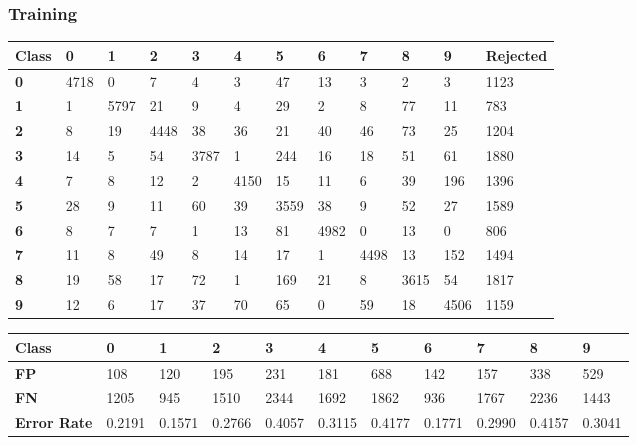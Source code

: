 \documentclass[
  a4paper,            %
  DIV=10,             %
  oneside,            %
  BCOR=5mm,           %
  parskip=half,       %
  numbers=noenddot,   %
  bibtotoc,           %
  listof=totoc,        %
  article
]{scrreprt}
\begin{document}
\subsubsection{Training}
\begin{center}
  \begin{tabular}{|p{1cm}|p{1cm}|p{1cm}|p{1cm}|p{1cm}|p{1cm}|p{1cm}|p{1cm}|p{1cm}|p{1cm}|p{1cm}|p{1.7cm}|}
    \hline
    \textbf{Class} & \textbf{0} & \textbf{1} & \textbf{2} & \textbf{3} & \textbf{4} & \textbf{5} & \textbf{6} & \textbf{7} & \textbf{8} & \textbf{9} & \textbf{Rejected} \\
    \hline
    \textbf{0} & 4718 & 0 & 7 & 4 & 3 & 47 & 13 & 3 & 2 & 3 & 1123 \\
    \hline
    \textbf{1} & 1 & 5797 & 21 & 9 & 4 & 29 & 2 & 8 & 77 & 11 & 783 \\
    \hline
    \textbf{2} & 8 & 19 & 4448 & 38 & 36 & 21 & 40 & 46 & 73 & 25 & 1204 \\
    \hline
    \textbf{3} & 14 & 5 & 54 & 3787 & 1 & 244 & 16 & 18 & 51 & 61 & 1880 \\
    \hline
    \textbf{4} & 7 & 8 & 12 & 2 & 4150 & 15 & 11 & 6 & 39 & 196 & 1396 \\
    \hline
    \textbf{5} & 28 & 9 & 11 & 60 & 39 & 3559 & 38 & 9 & 52 & 27 & 1589 \\
    \hline
    \textbf{6} & 8 & 7 & 7 & 1 & 13 & 81 & 4982 & 0 & 13 & 0 & 806 \\
    \hline
    \textbf{7} & 11 & 8 & 49 & 8 & 14 & 17 & 1 & 4498 & 13 & 152 & 1494 \\
    \hline
    \textbf{8} & 19 & 58 & 17 & 72 & 1 & 169 & 21 & 8 & 3615 & 54 & 1817 \\
    \hline
    \textbf{9} & 12 & 6 & 17 & 37 & 70 & 65 & 0 & 59 & 18 & 4506 & 1159 \\
    \hline
  \end{tabular}
\end{center}

\begin{center}
  \begin{tabular}{|p{1cm}|p{1cm}|p{1cm}|p{1cm}|p{1cm}|p{1cm}|p{1cm}|p{1cm}|p{1cm}|p{1cm}|p{1cm}|}
    \hline
    \textbf{Class} & \textbf{0} & \textbf{1} & \textbf{2} & \textbf{3} & \textbf{4} & \textbf{5} & \textbf{6} & \textbf{7} & \textbf{8} & \textbf{9} \\
    \hline
    \textbf{FP} & 108 & 120 & 195 & 231 & 181 & 688 & 142 & 157 & 338 & 529 \\
    \hline
    \textbf{FN} & 1205 & 945 & 1510 & 2344 & 1692 & 1862 & 936 & 1767 & 2236 & 1443 \\
    \hline
    \textbf{Error Rate} & 0.2191 & 0.1571 & 0.2766 & 0.4057 & 0.3115 & 0.4177 & 0.1771 & 0.2990 & 0.4157 & 0.3041 \\
    \hline
  \end{tabular}
\end{center}
\end{document}
